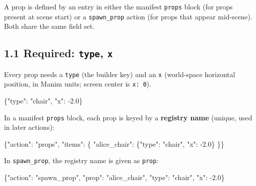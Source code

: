 \documentclass[
  11pt,
]{book}
\newenvironment{Shaded}{}{}
\newcommand{\DataTypeTok}[1]{\textcolor[rgb]{0.56,0.13,0.00}{#1}}
\newcommand{\FloatTok}[1]{\textcolor[rgb]{0.25,0.63,0.44}{#1}}
\newcommand{\FunctionTok}[1]{\textcolor[rgb]{0.02,0.16,0.49}{#1}}
\newcommand{\StringTok}[1]{\textcolor[rgb]{0.25,0.44,0.63}{#1}}
\begin{document}
A prop is defined by an entry in either the manifest \texttt{props}
block (for props present at scene start) or a \texttt{spawn\_prop}
action (for props that appear mid-scene). Both share the same field set.

\subsection{\texorpdfstring{1.1 Required: \texttt{type},
\texttt{x}}{1.1 Required: type, x}}\label{required-type-x}

Every prop needs a \texttt{type} (the builder key) and an \texttt{x}
(world-space horizontal position, in Manim units; screen center is
\texttt{x:\ 0}).

\begin{Shaded}
\begin{Highlighting}[]
\FunctionTok{\{}\DataTypeTok{"type"}\FunctionTok{:} \StringTok{"chair"}\FunctionTok{,} \DataTypeTok{"x"}\FunctionTok{:} \FloatTok{{-}2.0}\FunctionTok{\}}
\end{Highlighting}
\end{Shaded}

In a manifest \texttt{props} block, each prop is keyed by a
\textbf{registry name} (unique, used in later actions):

\begin{Shaded}
\begin{Highlighting}[]
\FunctionTok{\{}\DataTypeTok{"action"}\FunctionTok{:} \StringTok{"props"}\FunctionTok{,} \DataTypeTok{"items"}\FunctionTok{:} \FunctionTok{\{}
  \DataTypeTok{"alice\_chair"}\FunctionTok{:} \FunctionTok{\{}\DataTypeTok{"type"}\FunctionTok{:} \StringTok{"chair"}\FunctionTok{,} \DataTypeTok{"x"}\FunctionTok{:} \FloatTok{{-}2.0}\FunctionTok{\}}
\FunctionTok{\}\}}
\end{Highlighting}
\end{Shaded}

In \texttt{spawn\_prop}, the registry name is given as \texttt{prop}:

\begin{Shaded}
\begin{Highlighting}[]
\FunctionTok{\{}\DataTypeTok{"action"}\FunctionTok{:} \StringTok{"spawn\_prop"}\FunctionTok{,} \DataTypeTok{"prop"}\FunctionTok{:} \StringTok{"alice\_chair"}\FunctionTok{,}
 \DataTypeTok{"type"}\FunctionTok{:} \StringTok{"chair"}\FunctionTok{,} \DataTypeTok{"x"}\FunctionTok{:} \FloatTok{{-}2.0}\FunctionTok{\}}
\end{Highlighting}
\end{Shaded}
\end{document}
